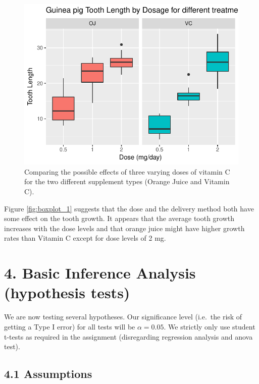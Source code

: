 \documentclass[]{article}
\begin{document}
\begin{figure}[h]

{\centering \includegraphics{toothgrowth_analysis_files/figure-latex/plot_fig_1-1} 

}

\caption{\label{fig:boxplot_1}Comparing the possible effects of three varying doses of vitamin C for the two different supplement types (Orange Juice and Vitamin C).}\label{fig:plot_fig_1}
\end{figure}

Figure \ref{fig:boxplot_1} suggests that the dose and the delivery
method both have some effect on the tooth growth. It appears that the
average tooth growth increases with the dose levels and that orange
juice might have higher growth rates than Vitamin C except for dose
levels of 2 mg.

\section{4. Basic Inference Analysis (hypothesis
tests)}\label{basic-inference-analysis-hypothesis-tests}

We are now testing several hypotheses. Our significance level (i.e.~the
risk of getting a Type I error) for all tests will be \(\alpha=0.05\).
We strictly only use student t-tests as required in the assignment
(disregarding regression analysis and anova test).

\subsection{4.1 Assumptions}\label{assumptions}
\end{document}
